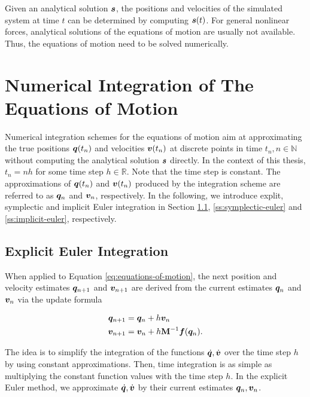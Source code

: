 \noindent Given an analytical solution $\bm{s}$, the positions and velocities of the simulated system at time $t$ can be determined by computing 
$\bm{s}(t)$. For general nonlinear forces, analytical solutions of the equations of motion are usually not available. Thus, the equations of motion 
need to be solved numerically.

\section{Numerical Integration of The Equations of Motion}\label{ss:numerical-integration}
Numerical integration schemes for the equations of motion aim at approximating the true positions $\bm{q}(t_n)$ and velocities $\bm{v}(t_n)$ 
at discrete points in time $t_n, n \in \mathbb{N}$ without computing the analytical solution $\bm{s}$ directly. In the context of this 
thesis, $t_n = nh$ for some time step $h \in \mathbb{R}$. Note that the time step is constant. The approximations of $\bm{q}(t_n)$ 
and $\bm{v}(t_n)$ produced by the integration scheme are referred to as $\bm{q}_n$ and $\bm{v}_n$, respectively. In the following, we 
introduce explit, symplectic and implicit Euler integration in Section \ref{ss:explicit-euler}, \ref{ss:symplectic-euler} and 
\ref{ss:implicit-euler}, respectively.

\subsection{Explicit Euler Integration}\label{ss:explicit-euler}
When applied to Equation \ref{eq:equations-of-motion}, the next position and velocity estimates $\bm{q}_{n+1}$ and $\bm{v}_{n+1}$ are derived 
from the current estimates $\bm{q}_n$ and $\bm{v}_n$ via the update formula

\begin{align*}
    \bm{q}_{n+1} &= \bm{q}_n + h\bm{v}_n\\
    \bm{v}_{n+1} &= \bm{v}_n + h\mathbf{M}^{-1}\bm{f}(\bm{q}_n).
\end{align*}

\noindent The idea is to simplify the integration of the functions $\dot{\bm{q}}, \dot{\bm{v}}$ over the time step $h$ by using constant 
approximations. Then, time integration is as simple as multiplying the constant function values 
with the time step $h$. In the explicit Euler method, we approximate $\dot{\bm{q}}, \dot{\bm{v}}$ by their current estimates $\bm{q}_n , 
\bm{v}_n$.

